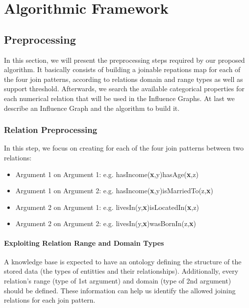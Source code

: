 \chapter{Algorithmic Framework}
\label{ch:intro}

\section{Preprocessing}

In this section, we will present the preprocessing steps required by our proposed algorithm. It basically consists of building a joinable repations map for each of the four join patterns, according to relations domain and range types as well as support threshold. Afterwards, we search the available categorical properties for each numerical relation that will be used in the Influence Graphs. At last we describe an Influence Graph and the algorithm to build it.

\subsection{Relation Preprocessing}

In this step, we focus on creating for each of the four join patterns between two relations:

\begin{itemize}
 \item Argument 1 on Argument 1: e.g. hasIncome(\textbf{x},y)hasAge(\textbf{x},z)
 \item Argument 1 on Argument 2: e.g. hasIncome(\textbf{x},y)isMarriedTo(z,\textbf{x})
 \item Argument 2 on Argument 1: e.g. livesIn(y,\textbf{x})isLocatedIn(\textbf{x},z)
 \item Argument 2 on Argument 2: e.g. livesIn(y,\textbf{x})wasBornIn(z,\textbf{x})
\end{itemize}



\subsubsection{Exploiting Relation Range and Domain Types}

A knowledge base is expected to have an ontology defining the structure of the stored data (the types of entitties and their relationships). Additionally, every relation's range (type of 1st argument) and domain (type of 2nd argument) should be defined. These information can help us identify the allowed joining relations for each join pattern.

